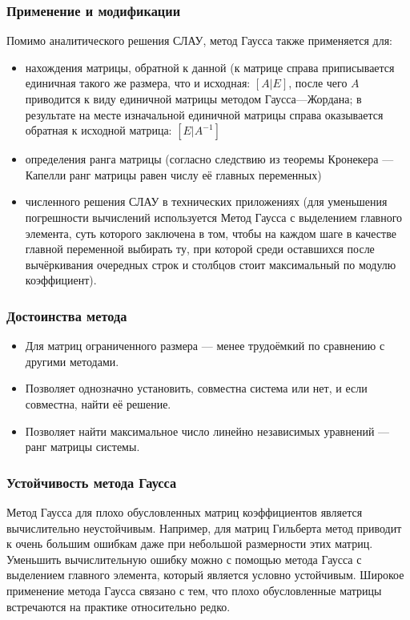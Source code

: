 \documentclass[a4paper]{article}
\begin{document}
\subsubsection{Применение и модификации}

Помимо аналитического решения СЛАУ, метод Гаусса также применяется для:

\begin{itemize}
 \item нахождения матрицы, обратной к данной (к матрице справа приписывается единичная такого же размера, что и исходная: $[A | E]$, после чего $A$ приводится к виду единичной матрицы методом Гаусса—Жордана; в результате на месте изначальной единичной матрицы справа оказывается обратная к исходной матрица: $[E | A^{-1}]$
 \item определения ранга матрицы (согласно следствию из теоремы Кронекера — Капелли ранг матрицы равен числу её главных переменных)
 \item численного решения СЛАУ в технических приложениях (для уменьшения погрешности вычислений используется Метод Гаусса с выделением главного элемента, суть которого заключена в том, чтобы на каждом шаге в качестве главной переменной выбирать ту, при которой среди оставшихся после вычёркивания очередных строк и столбцов стоит максимальный по модулю коэффициент).
\end{itemize}

\subsubsection{Достоинства метода}

\begin{itemize}
 \item Для матриц ограниченного размера — менее трудоёмкий по сравнению с другими методами.
 \item Позволяет однозначно установить, совместна система или нет, и если совместна, найти её решение.
 \item Позволяет найти максимальное число линейно независимых уравнений — ранг матрицы системы.
\end{itemize}

\subsubsection{Устойчивость метода Гаусса}

Метод Гаусса для плохо обусловленных матриц коэффициентов является вычислительно неустойчивым. Например, для матриц Гильберта метод приводит к очень большим ошибкам даже при небольшой размерности этих матриц. Уменьшить вычислительную ошибку можно с помощью метода Гаусса с выделением главного элемента, который является условно устойчивым. Широкое применение метода Гаусса связано с тем, что плохо обусловленные матрицы встречаются на практике относительно редко.
\end{document}
